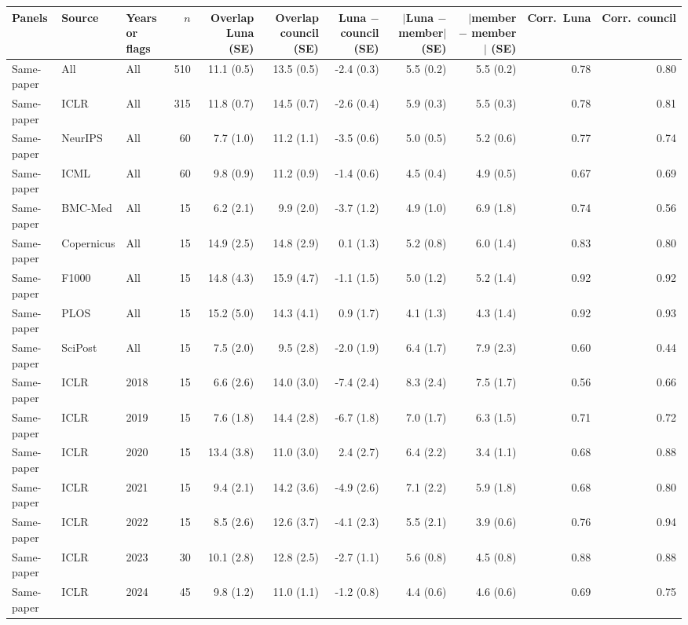 \begin{tabular}{lllrrrrrrrr}
\toprule
Panels & Source & Years or flags & $n$ & Overlap Luna (SE) & Overlap council (SE) & Luna $-$ council (SE) & $|$Luna $-$ member$|$ (SE) & $|$member $-$ member$|$ (SE) & Corr.\ Luna & Corr.\ council \\
\midrule
Same-paper & All & All & 510 & 11.1 (0.5) & 13.5 (0.5) & -2.4 (0.3) & 5.5 (0.2) & 5.5 (0.2) & 0.78 & 0.80 \\
Same-paper & ICLR & All & 315 & 11.8 (0.7) & 14.5 (0.7) & -2.6 (0.4) & 5.9 (0.3) & 5.5 (0.3) & 0.78 & 0.81 \\
Same-paper & NeurIPS & All & 60 & 7.7 (1.0) & 11.2 (1.1) & -3.5 (0.6) & 5.0 (0.5) & 5.2 (0.6) & 0.77 & 0.74 \\
Same-paper & ICML & All & 60 & 9.8 (0.9) & 11.2 (0.9) & -1.4 (0.6) & 4.5 (0.4) & 4.9 (0.5) & 0.67 & 0.69 \\
Same-paper & BMC-Med & All & 15 & 6.2 (2.1) & 9.9 (2.0) & -3.7 (1.2) & 4.9 (1.0) & 6.9 (1.8) & 0.74 & 0.56 \\
Same-paper & Copernicus & All & 15 & 14.9 (2.5) & 14.8 (2.9) & 0.1 (1.3) & 5.2 (0.8) & 6.0 (1.4) & 0.83 & 0.80 \\
Same-paper & F1000 & All & 15 & 14.8 (4.3) & 15.9 (4.7) & -1.1 (1.5) & 5.0 (1.2) & 5.2 (1.4) & 0.92 & 0.92 \\
Same-paper & PLOS & All & 15 & 15.2 (5.0) & 14.3 (4.1) & 0.9 (1.7) & 4.1 (1.3) & 4.3 (1.4) & 0.92 & 0.93 \\
Same-paper & SciPost & All & 15 & 7.5 (2.0) & 9.5 (2.8) & -2.0 (1.9) & 6.4 (1.7) & 7.9 (2.3) & 0.60 & 0.44 \\
Same-paper & ICLR & 2018 & 15 & 6.6 (2.6) & 14.0 (3.0) & -7.4 (2.4) & 8.3 (2.4) & 7.5 (1.7) & 0.56 & 0.66 \\
Same-paper & ICLR & 2019 & 15 & 7.6 (1.8) & 14.4 (2.8) & -6.7 (1.8) & 7.0 (1.7) & 6.3 (1.5) & 0.71 & 0.72 \\
Same-paper & ICLR & 2020 & 15 & 13.4 (3.8) & 11.0 (3.0) & 2.4 (2.7) & 6.4 (2.2) & 3.4 (1.1) & 0.68 & 0.88 \\
Same-paper & ICLR & 2021 & 15 & 9.4 (2.1) & 14.2 (3.6) & -4.9 (2.6) & 7.1 (2.2) & 5.9 (1.8) & 0.68 & 0.80 \\
Same-paper & ICLR & 2022 & 15 & 8.5 (2.6) & 12.6 (3.7) & -4.1 (2.3) & 5.5 (2.1) & 3.9 (0.6) & 0.76 & 0.94 \\
Same-paper & ICLR & 2023 & 30 & 10.1 (2.8) & 12.8 (2.5) & -2.7 (1.1) & 5.6 (0.8) & 4.5 (0.8) & 0.88 & 0.88 \\
Same-paper & ICLR & 2024 & 45 & 9.8 (1.2) & 11.0 (1.1) & -1.2 (0.8) & 4.4 (0.6) & 4.6 (0.6) & 0.69 & 0.75 \\

\end{tabular}
